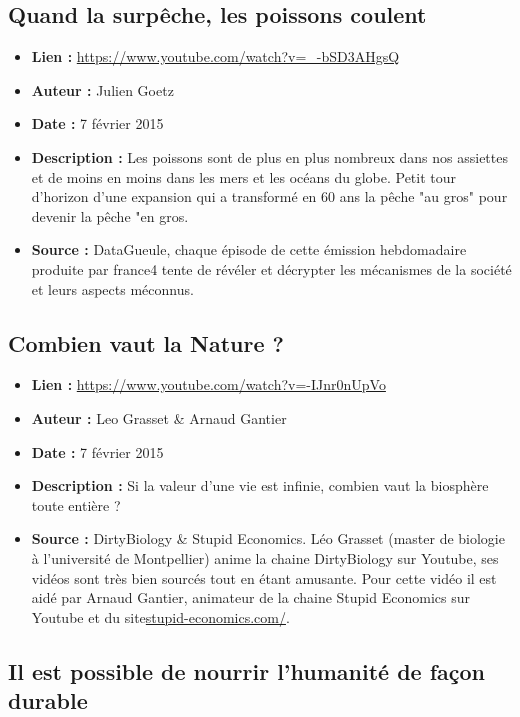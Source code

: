 \documentclass[8pt]{article}
\begin{document}
\newpage
\subsection{Quand la surpêche, les poissons coulent}
 
\begin{itemize}
	\item \textbf{Lien : }  \url{https://www.youtube.com/watch?v=_-bSD3AHgsQ} 
	\item \textbf{Auteur : } Julien Goetz
	\item \textbf{Date : } 7 février 2015
	\item \textbf{Description : } Les poissons sont de plus en plus nombreux dans nos assiettes et de moins en moins dans les mers et les océans du globe. Petit tour d'horizon d'une expansion qui a transformé en 60 ans la pêche "au gros" pour devenir la pêche "en gros.
	\item \textbf{Source : } DataGueule, chaque épisode de cette émission hebdomadaire produite par france4 tente de révéler et décrypter les mécanismes de la société et leurs aspects méconnus.
\end{itemize}

\newpage
\subsection{Combien vaut la Nature ?}
 
\begin{itemize}
	\item \textbf{Lien : }  \url{https://www.youtube.com/watch?v=-IJnr0nUpVo} 
	\item \textbf{Auteur : } Leo Grasset \& Arnaud Gantier
	\item \textbf{Date : } 7 février 2015
	\item \textbf{Description : } Si la valeur d'une vie est infinie, combien vaut la biosphère toute entière ?
	\item \textbf{Source : } DirtyBiology \& Stupid Economics. Léo Grasset (master de biologie à l'université de Montpellier) anime la chaine DirtyBiology sur Youtube, ses vidéos sont très bien sourcés tout en étant amusante. Pour cette vidéo il est aidé par Arnaud Gantier, animateur de la chaine Stupid Economics sur Youtube et du site\url{stupid-economics.com/}.
\end{itemize}
\newpage
\subsection{Il est possible de nourrir l’humanité de façon durable}
 
\end{document}
